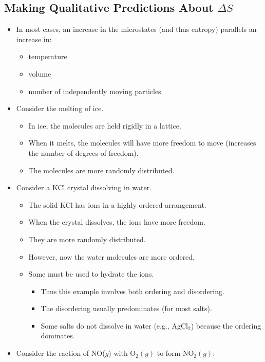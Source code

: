\documentclass[10pt]{article}
\begin{document}
\subsection*{Making Qualitative Predictions About $\Delta S$}
\begin{itemize}
    \item In most cases, an increase in the microstates (and thus entropy) parallels an increase in:
    \begin{itemize}
        \item temperature
        \item volume
        \item number of independently moving particles.
    \end{itemize}
    \item Consider the melting of ice.
    \begin{itemize}
        \item In ice, the molecules are held rigidly in a lattice.
        \item When it melts, the molecules will have more freedom to move (increases the number of degrees of freedom).
        \item The molecules are more randomly distributed.
    \end{itemize}
    \item Consider a KCl crystal dissolving in water.
    \begin{itemize}
        \item The solid KCl has ions in a highly ordered arrangement.
        \item When the crystal dissolves, the ions have more freedom.
        \item They are more randomly distributed.
        \item However, now the water molecules are more ordered.
        \item Some must be used to hydrate the ions.
        \begin{itemize}
            \item Thus this example involves both ordering and disordering.
            \item The disordering usually predominates (for most salts).
            \item Some salts do not dissolve in water (e.g., AgCl$_2$) because the ordering dominates.
        \end{itemize}
    \end{itemize}
    \item Consider the raction of NO($g$) with O$_2(g)$ to form NO$_2(g)$:

\end{itemize}
\end{document}
